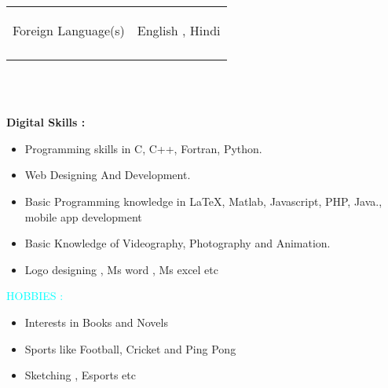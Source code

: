 \documentclass[12pt]{article}
\begin{document}
\begin{flushleft}
\begin{tabular}{ll}
\begin{large} Foreign Language(s) \end{large} & \hspace{0.5in} \begin{large}English , Hindi \end{large}\\\\
 \end{tabular}\\
\,\,\,\begin{large}
\textbf{Digital Skills : }\\
\begin{itemize}
\item Programming skills in C, C++, Fortran, Python.
\item Web Designing And Development.
\item Basic Programming knowledge in \LaTeX, Matlab, Javascript, PHP, Java., mobile app development
\item Basic Knowledge of Videography, Photography and Animation.
\item Logo designing , Ms word , Ms excel etc
\end{itemize}
\end{large}
\vspace{0.5in}
\textcolor{cyan}{HOBBIES : }
\begin{large}
\begin{itemize}
\item Interests in Books and Novels
\item Sports like Football, Cricket and Ping Pong
\item Sketching , Esports etc
\end{itemize}
\end{large}
\end{flushleft}
\end{document}
